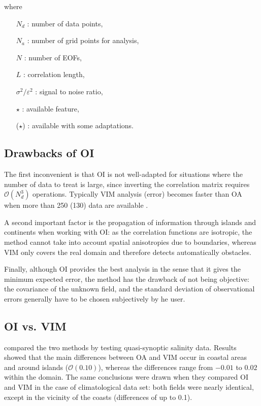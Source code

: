 where 
\begin{itemize}
\item[$N_d$]: number of data points,
\item[$N_a$]: number of grid points for analysis,
\item[$N$]: number of EOFs,
\item[$L$]: correlation length,
\item[$\sigma^2/ \varepsilon^2$]: signal to noise ratio,
\item[$\star$]: available feature,
\item[($\star$)]: available with some adaptations.
\end{itemize}

\subsection{Drawbacks of OI}

The first inconvenient is that OI is not well-adapted for situations where the number of data to treat is large, since inverting the correlation matrix requires  $\mathcal{O}(N_{d}^{3})$ operations. Typically VIM analysis (error) becomes faster than OA when more than 250 (130) data are available \citep{RIXEN00}. 

A second important factor is the propagation of information through islands and continents when working with OI: as the correlation functions are isotropic, the method cannot take into account spatial anisotropies due to boundaries, whereas VIM only covers the real domain and therefore detects automatically obstacles. 

Finally, although OI provides the best analysis in the sense that it gives the minimum expected error, the method has the drawback of not being objective: the covariance of the unknown field, and the standard deviation of observational errors generally have to be chosen subjectively by he user.



\subsection{OI vs. VIM}

\cite{RIXEN00} compared the two methods by testing quasi-synoptic salinity data. Results showed that the main differences between OA and VIM occur in coastal areas and around islands ($\mathcal{O}(0.10)$), whereas the differences range from $-0.01$ to $0.02$ within the domain. The same conclusions were drawn when they compared OI and VIM in the case of climatological data set: both fields were nearly identical, except in the vicinity of the coasts (differences of up to 0.1).

